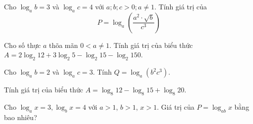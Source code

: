 \begin{bt}%
	Cho $\log _a b=3$ và $\log _a c=4$  với $a; b; c>0; a \neq 1$. Tính giá trị của
	 $$
	P=\log _a\left(\dfrac{a^2  \cdot \sqrt{b}}{c^3}\right)
	 $$
\end{bt}

\begin{bt}%
	Cho số thực  $a$ thõa mãn $0<a \neq 1$. Tính giá trị của biểu thức $A=2 \log_{2} 12+3 \log_{2} 5-\log_{2} 15-\log_{2} 150$.
\end{bt}

\begin{bt}%
	Cho $\log_ab=2$ và $\log_ac=3$. Tính $  Q=\log_a\left(b^2c^3\right) $.
\end{bt}

\begin{bt}%
	Tính giá  trị của biểu thức $A=\log_{8}12-\log_{8}15+\log_{8} 20$.
\end{bt}

\begin{ex}%
	Cho $\log_a x=3,\log_b x=4$ với $a > 1$, $b > 1$, $x > 1$. Giá trị  của $P=\log _{ab} x$ bằng bao nhiêu?
\end{ex}

